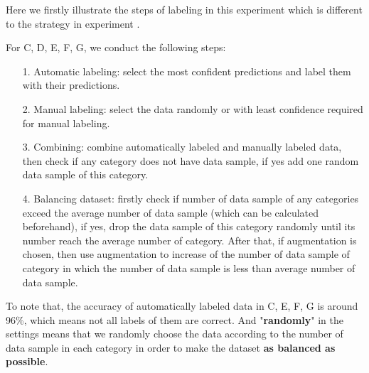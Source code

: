 Here we firstly illustrate the steps of labeling in this experiment which is different to the strategy in experiment . 

For C, D, E, F, G, we conduct the following steps:
\begin{itemize}
	\item[1.] Automatic labeling: select the most confident predictions and label them with their predictions.
	\item[2.] Manual labeling: select the data randomly or with least confidence required for manual labeling.
	\item[3.] Combining: combine automatically labeled and manually labeled data, then check if any category does not have data sample, if yes add one random data sample of this category.
	\item[4.] Balancing dataset: firstly check if number of data sample of any categories exceed the average number of data sample (which can be calculated beforehand), if yes, drop the data sample of this category randomly until its number reach the average number of category. After that, if augmentation is chosen, then use augmentation to increase of the number of data sample of category in which the number of data sample is less than average number of data sample.

\end{itemize}
To note that, the accuracy of automatically labeled data in C, E, F, G is around 96\%, which means not all labels of them are correct. And "\textbf{randomly}" in the settings means that we randomly choose the data according to the number of data sample in each category in order to make the dataset \textbf{as balanced as possible}.  
